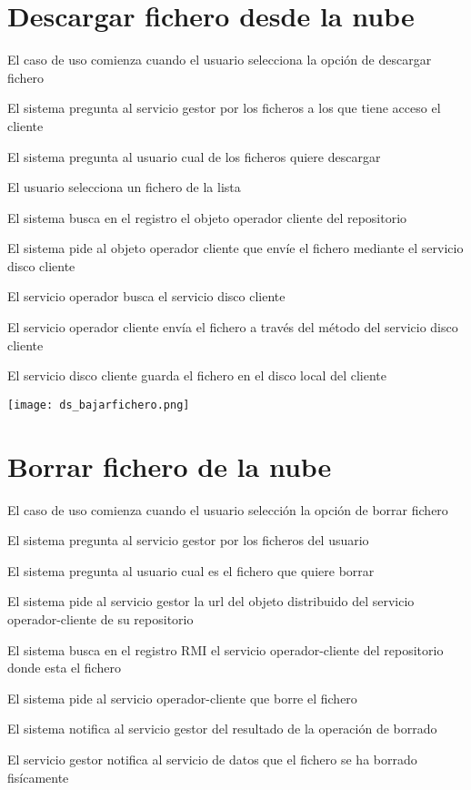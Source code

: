 \section{Descargar fichero desde la nube}
\begin{compactenum}
\item El caso de uso comienza cuando el usuario selecciona la opción de descargar fichero
\item El sistema pregunta al servicio gestor por los ficheros a los que tiene acceso el cliente
\item El sistema pregunta al usuario cual de los ficheros quiere descargar
\item El usuario selecciona un fichero de la lista
\item El sistema busca en el registro el objeto operador cliente del repositorio
\item El sistema pide al objeto operador cliente que envíe el fichero mediante el servicio disco cliente
\item El servicio operador busca el servicio disco cliente
\item El servicio operador cliente envía el fichero a través del método del servicio disco cliente
\item El servicio disco cliente guarda el fichero en el disco local del cliente
\end{compactenum}
\texttt{[image: ds\_bajarfichero.png]}

\section{Borrar fichero de la nube}
\begin{compactenum}
\item El caso de uso comienza cuando el usuario selección la opción de borrar fichero
\item El sistema pregunta al servicio gestor por los ficheros del usuario
\item El sistema pregunta al usuario cual es el fichero que quiere borrar
\item El sistema pide al servicio gestor la url del objeto distribuido del servicio operador-cliente de su repositorio
\item El sistema busca en el registro RMI el servicio operador-cliente del repositorio donde esta el fichero
\item El sistema pide al servicio operador-cliente que borre el fichero
\item El sistema notifica al servicio gestor del resultado de la operación de borrado
\item El servicio gestor notifica al servicio de datos que el fichero se ha borrado fisícamente
\end{compactenum}


